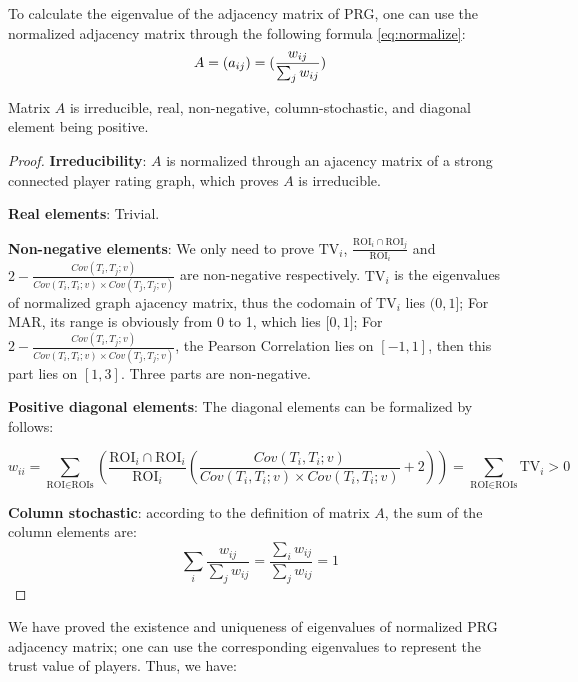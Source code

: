To calculate the eigenvalue of the adjacency matrix of PRG, one can use the normalized adjacency matrix 
through the following formula \ref{eq:normalize}:
\begin{equation}
\label{eq:normalize}
A = (a_{ij}) = (\frac{w_{ij}}{\sum_{j}{w_{ij}}})\\
\end{equation}

\begin{theorem}
Matrix $A$ is irreducible, real, non-negative, column-stochastic, and diagonal element being positive.
\end{theorem}

\begin{proof}
\textbf{Irreducibility}: $A$ is normalized through an ajacency matrix of a strong connected player
rating graph, which proves $A$ is irreducible.

\textbf{Real elements}: Trivial.

\textbf{Non-negative elements}: We only need to prove $\text{TV}_i$, 
$\frac{\text{ROI}_i\cap\text{ROI}_j}{\text{ROI}_i}$ and 
$2-\frac{Cov(T_i, T_j; v)}{Cov(T_i, T_i; v)\times Cov(T_j, T_j; v)}$ are non-negative 
respectively. $\text{TV}_i$ is the eigenvalues of normalized graph ajacency matrix, 
thus the codomain of $\text{TV}_i$ lies $(0, 1\rbrack$; For MAR, its range is obviously from 0 to 1,
which lies $\lbrack 0, 1 \rbrack$; For $2-\frac{Cov(T_i, T_j; v)}{Cov(T_i, T_i; v)\times Cov(T_j, T_j; v)}$,
the Pearson Correlation lies on $[-1, 1]$, then this part lies on $[1, 3]$.
Three parts are non-negative.
  
\textbf{Positive diagonal elements}: The diagonal elements can be formalized by follows:

\[
w_{ii} = 
\sum_{\text{ROI}\in\text{ROIs}}{\left(
  \frac{\text{ROI}_i\cap\text{ROI}_i}{\text{ROI}_i}
  \left( \frac{Cov(T_i, T_i; v)}
      {Cov(T_i, T_i; v)\times Cov(T_i, T_i; v)} + 2 \right)\right)
} = \sum_{\text{ROI}\in\text{ROIs}}{\text{TV}_i} > 0
\]

\textbf{Column stochastic}: according to the definition of matrix $A$, the sum of the column
elements are:
\[
  \sum_{i}{\frac{w_{ij}}{\sum_{j}{w_{ij}}}} 
  = \frac{\sum_{i}{w_{ij}}}{\sum_{j}{w_{ij}}} = 1
\]
\end{proof}

We have proved the existence and uniqueness of eigenvalues of normalized PRG adjacency matrix; 
one can use the corresponding eigenvalues to represent the trust value of players. Thus, we have:

